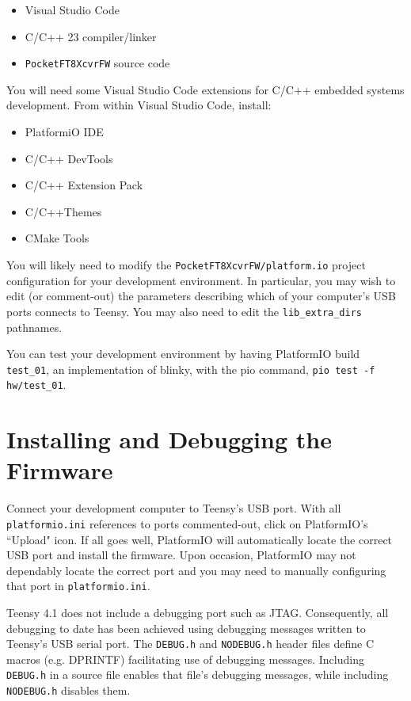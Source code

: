 \documentclass[10pt, letterpaper,]{article}
\begin{document}
\begin{itemize} [noitemsep]
\item Visual Studio Code
\item C/C++ 23 compiler/linker
\item \texttt{PocketFT8XcvrFW} source code 
\end{itemize}

You will need some Visual Studio Code extensions for C/C++ embedded systems development.
From within Visual Studio Code, install:
\begin{itemize} [noitemsep]
\item PlatformiO IDE
\item C/C++ DevTools
\item C/C++ Extension Pack
\item C/C++Themes
\item CMake Tools
\end{itemize}

You will likely need to modify the \texttt{PocketFT8XcvrFW/platform.io} project configuration for your development environment.
In particular, you may wish to edit (or comment-out) the parameters describing which of your computer's USB ports connects to Teensy.
You may also need to edit the \texttt{lib\_extra\_dirs} pathnames.

You can test your development environment by having PlatformIO build \texttt{test\_01}, an implementation of blinky, with  the pio command, \texttt{pio test -f hw/test\_01}.

\section*{Installing and Debugging the Firmware}
Connect your development computer to Teensy's USB port.
With all \texttt{platformio.ini} references to ports commented-out, click on PlatformIO's ``Upload" icon.
If all goes well, PlatformIO will automatically locate the correct USB port and install the firmware.
Upon occasion, PlatformIO may not dependably locate the correct port and you may need to manually configuring that port in \texttt{platformio.ini}.

Teensy 4.1 does not include a debugging port such as JTAG.
Consequently, all debugging to date has been achieved using debugging messages written to Teensy's USB serial port.
The \texttt{DEBUG.h} and \texttt{NODEBUG.h} header files define C macros (e.g. DPRINTF) facilitating use of debugging messages.
Including \texttt{DEBUG.h} in a source file enables that file's debugging messages, while including \texttt{NODEBUG.h} disables them.
\end{document}
